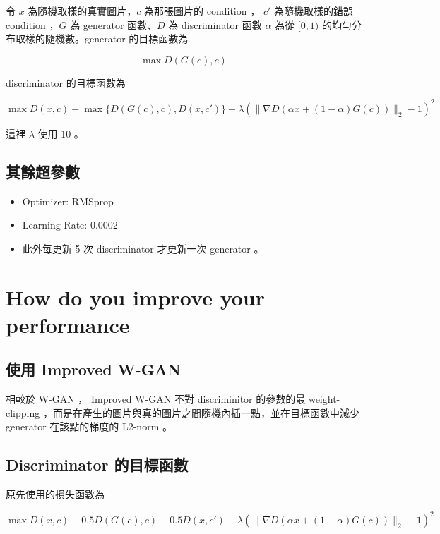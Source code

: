 \documentclass[fleqn,a4paper,12pt]{article}
\begin{document}
令 $x$ 為隨機取樣的真實圖片，$c$ 為那張圖片的 condition ， $c'$ 為隨機取樣的錯誤 condition ，$G$ 為 generator 函數、$D$ 為 discriminator 函數 $\alpha$ 為從 $[0, 1)$ 的均勻分布取樣的隨機數。generator 的目標函數為

\begin{equation*}
  \max D(G(c), c)
\end{equation*}

discriminator 的目標函數為

\begin{equation*}
  \max D(x, c) -\max\{D(G(c), c), D(x, c')\} - \lambda (\lVert \nabla D(\alpha x + (1 - \alpha) G(c)) \rVert_2 - 1)^2
\end{equation*}

這裡 $\lambda$ 使用 10 。

\subsection{其餘超參數}

\begin{itemize}
\item Optimizer: RMSprop
\item Learning Rate: $0.0002$
\item 此外每更新 5 次 discriminator 才更新一次 generator 。
\end{itemize}


\section{How do you improve your performance}

\subsection{使用 Improved W-GAN}

相較於 W-GAN ， Improved W-GAN 不對 discriminitor 的參數的最 weight-clipping ，而是在產生的圖片與真的圖片之間隨機內插一點，並在目標函數中減少 generator 在該點的梯度的 L2-norm 。

\subsection{Discriminator 的目標函數}

原先使用的損失函數為

\begin{equation*}
  \max D(x, c) - 0.5 D(G(c), c) - 0.5 D(x, c') - \lambda (\lVert \nabla D(\alpha x + (1 - \alpha) G(c)) \rVert_2 - 1)^2  
\end{equation*}
\end{document}
